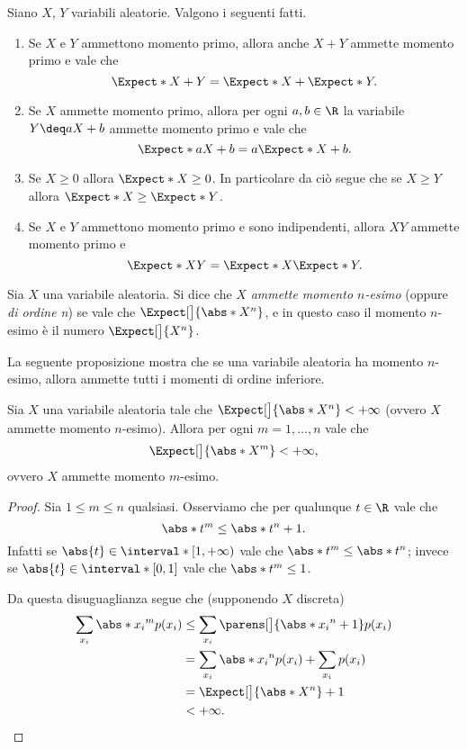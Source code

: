 \begin{proposition}
    Siano $X$, $Y$ variabili aleatorie. Valgono i seguenti fatti.
    \begin{enumerate}[label={(\roman*)}]
        \item Se $X$ e $Y$ ammettono momento primo, allora anche $X + Y$ ammette momento primo e vale che \[
            \Expect*{X+ Y} = \Expect*{X} + \Expect*{Y}.    
        \]
        \item Se $X$ ammette momento primo, allora per ogni $a, b \in \R$ la variabile $Y \deq aX + b$ ammette momento primo e vale che \[
            \Expect*{aX + b} = a\Expect*{X} + b.    
        \]
        \item Se $X \geq 0$ allora $\Expect*{X} \geq 0$. In particolare da ciò segue che se $X \geq Y$ allora $\Expect*{X} \geq \Expect*{Y}$.
        \item Se $X$ e $Y$ ammettono momento primo e sono indipendenti, allora $XY$ ammette momento primo e \[
            \Expect*{XY} = \Expect*{X}\Expect*{Y}.    
        \]
    \end{enumerate}
\end{proposition}

\begin{definition}
     Sia $X$ una variabile aleatoria. Si dice che $X$ \emph{ammette momento $n$-esimo} (oppure \emph{di ordine n}) se vale che $\Expect[\big]{\abs*{X^n}}$, e in questo caso il momento $n$-esimo è il numero $\Expect[\big]{X^n}$.
\end{definition}

La seguente proposizione mostra che se una variabile aleatoria ha momento $n$-esimo, allora ammette tutti i momenti di ordine inferiore.

\begin{proposition}
    Sia $X$ una variabile aleatoria tale che $\Expect[\big]{\abs*{X^n}} < +\infty$ (ovvero $X$ ammette momento $n$-esimo). Allora per ogni $m = 1, \dots, n$ vale che \[
        \Expect[\big]{\abs*{X^m}} < +\infty,    
    \] ovvero $X$ ammette momento $m$-esimo.
\end{proposition}
\begin{proof}
    Sia $1 \leq m \leq n$ qualsiasi. Osserviamo che per qualunque $t \in \R$ vale che \[
        \abs*{t}^m \leq \abs*{t}^n + 1.
    \] Infatti se $\abs{t} \in \interval*[{1, +\infty})$ vale che $\abs*{t}^m \leq \abs*{t}^n$; invece se $\abs{t} \in \interval*[{0, 1}]$ vale che $\abs*{t}^m \leq 1$.

    Da questa disuguaglianza segue che (supponendo $X$ discreta) \begin{align*}
        \sum_{x_i} \abs*{x_i}^m p(x_i)
        &\leq \sum_{x_i} \parens[\big]{\abs*{x_i}^n + 1}p(x_i)\\
        &= \sum_{x_i} \abs*{x_i}^np(x_i) + \sum_{x_i} p(x_i)\\
        &= \Expect[\big]{\abs*{X}^n} + 1\\
        &< +\infty. \qedhere
    \end{align*}
\end{proof}

